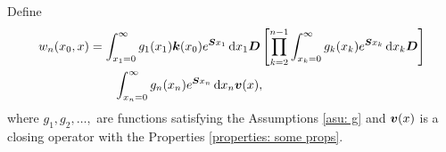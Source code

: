 Define 
\begin{align}
		w_n(x_0,x) &= \int_{x_1=0}^\infty g_1(x_1) \boldsymbol k(x_0) e^{\boldsymbol{S}x_1}\, \mathrm{d} x_1\boldsymbol D 
            	\left[\prod_{k=2}^{n-1}\int_{x_k=0}^\infty g_k(x_k) e^{\boldsymbol{S}x_k} \, \mathrm{d} x_k \boldsymbol D\right] \nonumber
		\\&\qquad{}\int_{x_n=0}^\infty g_{n}(x_n) e^{\boldsymbol{S}x_n} \, \mathrm{d} x_n {\boldsymbol v}(x), \nonumber 
\end{align}
where \(g_1,g_2,\dots,\) are functions satisfying the Assumptions \ref{asu: g} and \({\boldsymbol v}(x)\) is a closing operator with the Properties \ref{properties: some props}. %


